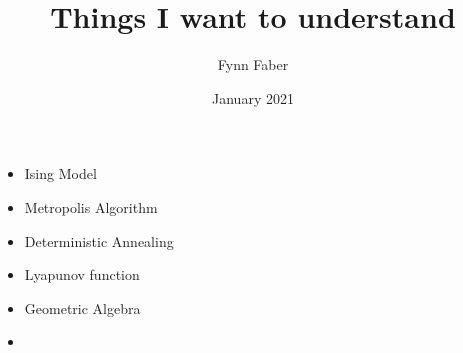\documentclass{article}
\title{Things I want to understand}
\author{Fynn Faber}
\date{January 2021}
\begin{document}
\maketitle

\begin{itemize}
    \item Ising Model
    \item Metropolis Algorithm
    \item Deterministic Annealing
    \item Lyapunov function
    \item Geometric Algebra
    \item 
\end{itemize}

\end{document}
